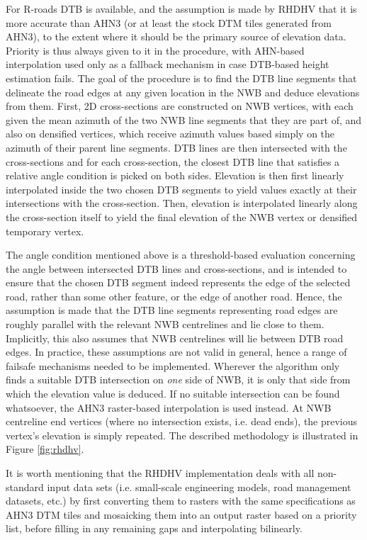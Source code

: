 For R-roads DTB is available, and the assumption is made by RHDHV that it is more accurate than AHN3 (or at least the stock DTM tiles generated from AHN3), to the extent where it should be the primary source of elevation data. Priority is thus always given to it in the procedure, with AHN-based interpolation used only as a fallback mechanism in case DTB-based height estimation fails. The goal of the procedure is to find the DTB line segments that delineate the road edges at any given location in the NWB and deduce elevations from them. First, 2D cross-sections are constructed on NWB vertices, with each given the mean azimuth of the two NWB line segments that they are part of, and also on densified vertices, which receive azimuth values based simply on the azimuth of their parent line segments. DTB lines are then intersected with the cross-sections and for each cross-section, the closest DTB line that satisfies a relative angle condition is picked on both sides. Elevation is then first linearly interpolated inside the two chosen DTB segments to yield values exactly at their intersections with the cross-section. Then, elevation is interpolated linearly along the cross-section itself to yield the final elevation of the NWB vertex or densified temporary vertex.

The angle condition mentioned above is a threshold-based evaluation concerning the angle between intersected DTB lines and cross-sections, and is intended to ensure that the chosen DTB segment indeed represents the edge of the selected road, rather than some other feature, or the edge of another road. Hence, the assumption is made that the DTB line segments representing road edges are roughly parallel with the relevant NWB centrelines and lie close to them. Implicitly, this also assumes that NWB centrelines will lie between DTB road edges. In practice, these assumptions are not valid in general, hence a range of failsafe mechanisms needed to be implemented. Wherever the algorithm only finds a suitable DTB intersection on \textit{one} side of NWB, it is only that side from which the elevation value is deduced. If no suitable intersection can be found whatsoever, the AHN3 raster-based interpolation is used instead. At NWB centreline end vertices (where no intersection exists, i.e. dead ends), the previous vertex’s elevation is simply repeated. The described methodology is illustrated in Figure \ref{fig:rhdhv}.

It is worth mentioning that the RHDHV implementation deals with all non-standard input data sets (i.e. small-scale engineering models, road management datasets, etc.) by first converting them to rasters with the same specifications as AHN3 DTM tiles and mosaicking them into an output raster based on a priority list, before filling in any remaining gaps and interpolating bilinearly.

